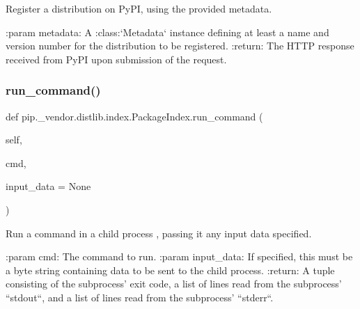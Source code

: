 \begin{DoxyVerb}Register a distribution on PyPI, using the provided metadata.

:param metadata: A :class:`Metadata` instance defining at least a name
         and version number for the distribution to be
         registered.
:return: The HTTP response received from PyPI upon submission of the
request.
\end{DoxyVerb}
 \mbox{\label{classpip_1_1__vendor_1_1distlib_1_1index_1_1PackageIndex_a54f629e14238e91a7826fce4199bcd10}} 
\subsubsection{\texorpdfstring{run\+\_\+command()}{run\_command()}}
{\footnotesize\ttfamily def pip.\+\_\+vendor.\+distlib.\+index.\+Package\+Index.\+run\+\_\+command (\begin{DoxyParamCaption}\item[{}]{self,  }\item[{}]{cmd,  }\item[{}]{input\+\_\+data = {\ttfamily None} }\end{DoxyParamCaption})}

\begin{DoxyVerb}Run a command in a child process , passing it any input data specified.

:param cmd: The command to run.
:param input_data: If specified, this must be a byte string containing
           data to be sent to the child process.
:return: A tuple consisting of the subprocess' exit code, a list of
 lines read from the subprocess' ``stdout``, and a list of
 lines read from the subprocess' ``stderr``.
\end{DoxyVerb}
 \mbox{\label{classpip_1_1__vendor_1_1distlib_1_1index_1_1PackageIndex_a2c5293c68e845790c16bafefb7393d05}} 
